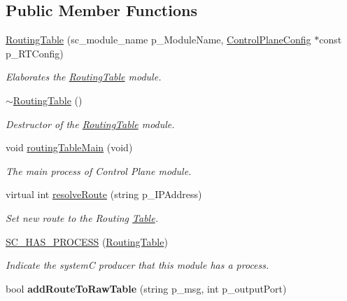 \subsection*{Public Member Functions}
\begin{DoxyCompactItemize}
\item 
\hypertarget{classRoutingTable_a71a78835bd82f883251e5937cd3d9bcc}{\hyperlink{classRoutingTable_a71a78835bd82f883251e5937cd3d9bcc}{Routing\-Table} (sc\-\_\-module\-\_\-name p\-\_\-\-Module\-Name, \hyperlink{classControlPlaneConfig}{Control\-Plane\-Config} $\ast$const p\-\_\-\-R\-T\-Config)}\label{classRoutingTable_a71a78835bd82f883251e5937cd3d9bcc}

\begin{DoxyCompactList}\small\item\em Elaborates the \hyperlink{classRoutingTable}{Routing\-Table} module. \end{DoxyCompactList}\item 
\hyperlink{classRoutingTable_abe5b508511742899600b98401af7c761}{$\sim$\-Routing\-Table} ()
\begin{DoxyCompactList}\small\item\em Destructor of the \hyperlink{classRoutingTable}{Routing\-Table} module. \end{DoxyCompactList}\item 
void \hyperlink{classRoutingTable_a9cde93247eb0ec479d085c427e8c040d}{routing\-Table\-Main} (void)
\begin{DoxyCompactList}\small\item\em The main process of Control Plane module. \end{DoxyCompactList}\item 
\hypertarget{classRoutingTable_a15cac9bbc532546c14ce29d5b19772bc}{virtual int \hyperlink{classRoutingTable_a15cac9bbc532546c14ce29d5b19772bc}{resolve\-Route} (string p\-\_\-\-I\-P\-Address)}\label{classRoutingTable_a15cac9bbc532546c14ce29d5b19772bc}

\begin{DoxyCompactList}\small\item\em Set new route to the Routing \hyperlink{classTable}{Table}. \end{DoxyCompactList}\item 
\hyperlink{classRoutingTable_a6672fa1eeba99406384473815b27b6ea}{S\-C\-\_\-\-H\-A\-S\-\_\-\-P\-R\-O\-C\-E\-S\-S} (\hyperlink{classRoutingTable}{Routing\-Table})
\begin{DoxyCompactList}\small\item\em Indicate the system\-C producer that this module has a process. \end{DoxyCompactList}\item 
\hypertarget{classRoutingTable_a2d64d4f1e7d3a8cbb209633c1f50cae2}{bool {\bfseries add\-Route\-To\-Raw\-Table} (string p\-\_\-msg, int p\-\_\-output\-Port)}\label{classRoutingTable_a2d64d4f1e7d3a8cbb209633c1f50cae2}


\end{DoxyCompactItemize}
